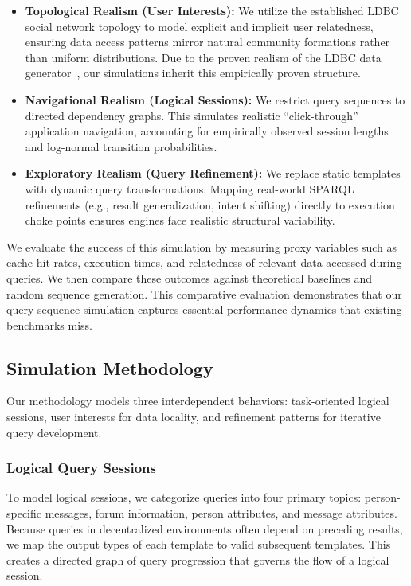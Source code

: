 \begin{itemize}
    \item \textbf{Topological Realism (User Interests):} We utilize the established LDBC social network topology
    to model explicit and implicit user relatedness, ensuring data access patterns mirror natural community formations 
    rather than uniform distributions. Due to the proven realism of the LDBC data generator~\cite{prat2014community}, 
    our simulations inherit this empirically proven structure.
    
    \item \textbf{Navigational Realism (Logical Sessions):} We restrict query sequences to directed dependency graphs.
    This simulates realistic ``click-through'' application navigation, 
    accounting for empirically observed session lengths and log-normal transition probabilities.  
 
    \item \textbf{Exploratory Realism (Query Refinement):} We replace static templates with dynamic query transformations. 
    Mapping real-world SPARQL refinements (e.g., result generalization, intent shifting) directly to execution choke points 
    ensures engines face realistic structural variability.
\end{itemize}

We evaluate the success of this simulation by measuring proxy variables such as
cache hit rates, execution times, and relatedness of relevant data accessed during queries. 
We then compare these outcomes against theoretical baselines and random sequence generation. 
This comparative evaluation demonstrates that our query sequence simulation captures essential 
performance dynamics that existing benchmarks miss.


\subsection{Simulation Methodology}
Our methodology models three interdependent behaviors: task-oriented logical sessions,
user interests for data locality,
and refinement patterns for iterative query development.

\subsubsection{Logical Query Sessions}
To model logical sessions, we categorize queries into four primary topics: 
person-specific messages, forum information, person attributes, and message attributes. 
Because queries in decentralized environments often depend on preceding results, 
we map the output types of each template to valid subsequent templates. 
This creates a directed graph of query progression that governs the flow of a logical session.

